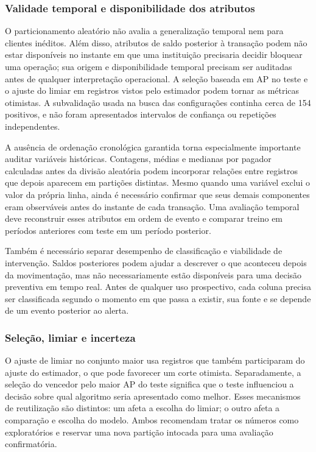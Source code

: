 \documentclass[11pt,a4paper]{article}
\begin{document}
\subsubsection{Validade temporal e disponibilidade dos atributos}

O particionamento aleatório não avalia a generalização temporal nem para clientes inéditos. Além disso, atributos de saldo posterior à transação podem não estar disponíveis no instante em que uma instituição precisaria decidir bloquear uma operação; sua origem e disponibilidade temporal precisam ser auditadas antes de qualquer interpretação operacional. A seleção baseada em AP no teste e o ajuste do limiar em registros vistos pelo estimador podem tornar as métricas otimistas. A subvalidação usada na busca das configurações continha cerca de 154 positivos, e não foram apresentados intervalos de confiança ou repetições independentes.

A ausência de ordenação cronológica garantida torna especialmente importante auditar variáveis históricas. Contagens, médias e medianas por pagador calculadas antes da divisão aleatória podem incorporar relações entre registros que depois aparecem em partições distintas. Mesmo quando uma variável exclui o valor da própria linha, ainda é necessário confirmar que seus demais componentes eram observáveis antes do instante de cada transação. Uma avaliação temporal deve reconstruir esses atributos em ordem de evento e comparar treino em períodos anteriores com teste em um período posterior.

Também é necessário separar desempenho de classificação e viabilidade de intervenção. Saldos posteriores podem ajudar a descrever o que aconteceu depois da movimentação, mas não necessariamente estão disponíveis para uma decisão preventiva em tempo real. Antes de qualquer uso prospectivo, cada coluna precisa ser classificada segundo o momento em que passa a existir, sua fonte e se depende de um evento posterior ao alerta.

\subsubsection{Seleção, limiar e incerteza}

O ajuste de limiar no conjunto maior usa registros que também participaram do ajuste do estimador, o que pode favorecer um corte otimista. Separadamente, a seleção do vencedor pelo maior AP do teste significa que o teste influenciou a decisão sobre qual algoritmo seria apresentado como melhor. Esses mecanismos de reutilização são distintos: um afeta a escolha do limiar; o outro afeta a comparação e escolha do modelo. Ambos recomendam tratar os números como exploratórios e reservar uma nova partição intocada para uma avaliação confirmatória.
\end{document}
